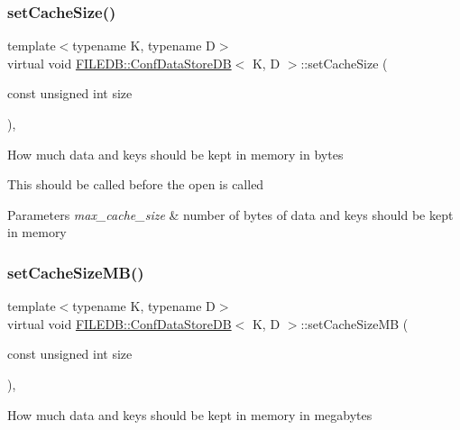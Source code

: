 \subsubsection{\texorpdfstring{setCacheSize()}{setCacheSize()}\hspace{0.1cm}{\footnotesize\ttfamily [3/3]}}
{\footnotesize\ttfamily template$<$typename K, typename D$>$ \\
virtual void \mbox{\hyperlink{classFILEDB_1_1ConfDataStoreDB}{F\+I\+L\+E\+D\+B\+::\+Conf\+Data\+Store\+DB}}$<$ K, D $>$\+::set\+Cache\+Size (\begin{DoxyParamCaption}\item[{const unsigned int}]{size }\end{DoxyParamCaption})\hspace{0.3cm}{\ttfamily [inline]}, {\ttfamily [virtual]}}

How much data and keys should be kept in memory in bytes

This should be called before the open is called 
\begin{DoxyParams}{Parameters}
{\em max\+\_\+cache\+\_\+size} & number of bytes of data and keys should be kept in memory \\
\hline
\end{DoxyParams}
\mbox{\label{classFILEDB_1_1ConfDataStoreDB_aa5fafbdd147d1b66d8fcc6821dc3804f}} 
\subsubsection{\texorpdfstring{setCacheSizeMB()}{setCacheSizeMB()}\hspace{0.1cm}{\footnotesize\ttfamily [1/3]}}
{\footnotesize\ttfamily template$<$typename K, typename D$>$ \\
virtual void \mbox{\hyperlink{classFILEDB_1_1ConfDataStoreDB}{F\+I\+L\+E\+D\+B\+::\+Conf\+Data\+Store\+DB}}$<$ K, D $>$\+::set\+Cache\+Size\+MB (\begin{DoxyParamCaption}\item[{const unsigned int}]{size }\end{DoxyParamCaption})\hspace{0.3cm}{\ttfamily [inline]}, {\ttfamily [virtual]}}

How much data and keys should be kept in memory in megabytes


